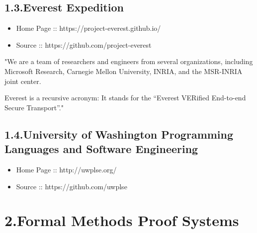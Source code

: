 \documentclass[12pt,twoside]{article}
\begin{document}
\subsection{1.3.\hspace*{0.5em}Everest Expedition}\label{sec-everest-expedition}%

\begin{itemize}[noitemsep,topsep=\mdcompacttopsep]%

\item{}Home Page :: https://project-everest.github.io/%

\item{}Source :: https://github.com/project-everest%
\end{itemize}%

\noindent{}"We are a team of researchers and engineers from several
organizations, including Microsoft Research, Carnegie Mellon
University, INRIA, and the MSR-INRIA joint center.%

Everest is a recursive acronym: It stands for the “Everest VERified
End-to-end Secure Transport”."%

\subsection{1.4.\hspace*{0.5em}University of Washington Programming Languages and Software Engineering}\label{sec-university-of-washington-programming-languages-and-software-engineering}%

\begin{itemize}[noitemsep,topsep=\mdcompacttopsep]%

\item{}Home Page :: http://uwplse.org/%

\item{}Source :: https://github.com/uwplse%
\end{itemize}%

\section{2.\hspace*{0.5em}Formal Methods Proof Systems}\label{sec-formal-methods-proof-systems}%
\end{document}
